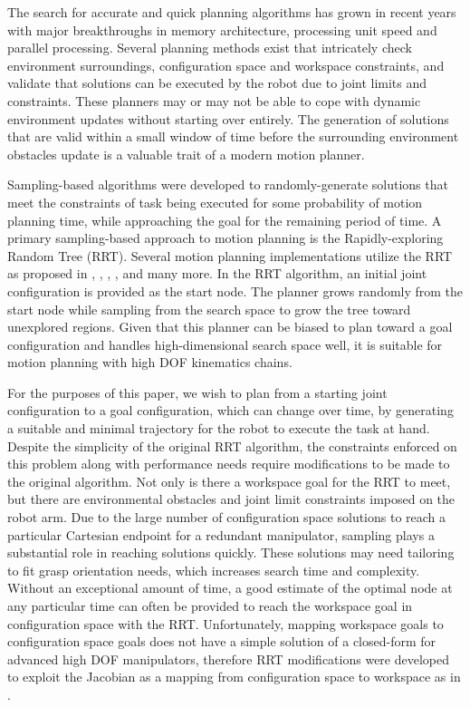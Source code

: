 \documentclass[conference]{IEEEtran} \usepackage[T1]{fontenc} \usepackage[backend=biber, style=ieee]{biblatex}
\begin{document}
The search for accurate and quick planning algorithms has grown in recent years with major breakthroughs in memory architecture, processing unit speed and 
parallel processing. Several planning methods exist that intricately check environment surroundings, configuration space and workspace constraints, and validate
that solutions can be executed by the robot due to joint limits and constraints. These planners may or may not be able to cope with dynamic environment updates
without starting over entirely. The generation of solutions that are valid within a small window of time before the surrounding environment obstacles update
is a valuable trait of a modern motion planner.

Sampling-based algorithms were developed to randomly-generate solutions that meet the constraints of task being executed for some probability of motion planning time, while 
approaching the goal for the remaining period of time. A primary sampling-based approach to motion planning is the Rapidly-exploring Random Tree (RRT). Several motion planning
implementations utilize the RRT as proposed in \cite{rand_kin_planning}, \cite{anytime_rrts}, \cite{random_planner_wo_ik}, \cite{humanoid_motion_planning}, and many more. In the 
RRT algorithm, an initial joint configuration is provided as the start node. The planner grows randomly from the start node while sampling from the search space to grow the tree 
toward unexplored regions. Given that this planner can be biased to plan toward a goal configuration and handles high-dimensional search space well, it is suitable for motion
planning with high DOF kinematics chains. 

For the purposes of this paper, we wish to plan from a starting joint configuration to a  goal configuration, which can change over time, by generating a suitable and minimal
trajectory for the robot to execute the task at hand. Despite the simplicity of the original RRT algorithm, the constraints enforced on this problem along with performance needs
require modifications to be made to the original algorithm. Not only is there a workspace goal for the RRT to meet, but there are environmental obstacles and joint limit 
constraints imposed on the robot arm. Due to the large number of configuration space solutions to reach a particular Cartesian endpoint for a redundant manipulator, sampling plays 
a substantial role in reaching solutions quickly. These solutions may need tailoring to fit grasp orientation needs, which increases search time and complexity. Without
an exceptional amount of time, a good estimate of the optimal node at any particular time can often be provided to reach the workspace goal in configuration space with the RRT. 
Unfortunately, mapping workspace goals to configuration space goals does not have a simple solution of a closed-form for advanced high DOF manipulators, therefore RRT
modifications were developed to exploit the Jacobian as a mapping from configuration space to workspace as in \cite{random_planner_wo_ik}.
\end{document}
